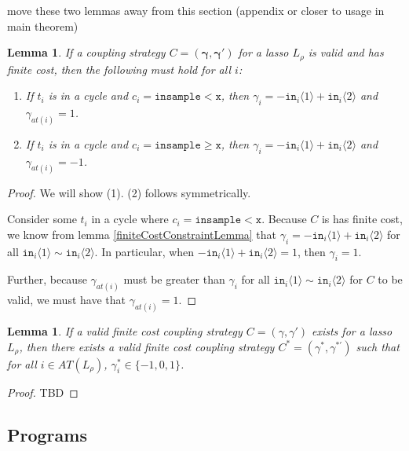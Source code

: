 \documentclass[12pt]{article}
\newcommand{\gguard}[1][x]{\texttt{insample}\geq #1}
\newcommand{\lguard}[1][x]{\texttt{insample} < #1}
\newcommand{\brangle}[1]{\langle #1 \rangle}
\newtheorem{lemma}[thm]{Lemma}
\theoremstyle{definition}
\begin{document}
{\color{red} move these two lemmas away from this section (appendix or closer to usage in main theorem)}

\begin{lemma}\label{cycleGammaConstraints}
    If a coupling strategy $C=(\mathbf{\gamma}, \mathbf{\gamma}')$ for a lasso $L_\rho$ is valid and has finite cost, then the following must hold for all $i$:
    \begin{enumerate}
        \item If $t_i$ is in a cycle and $c_i = \lguard[\texttt{x}]$, then $\gamma_i = -\texttt{in}_i\brangle{1}+\texttt{in}_i\brangle{2}$ and $\gamma_{at(i)} = 1$.
        \item If $t_i$ is in a cycle and $c_i = \gguard[\texttt{x}]$, then $\gamma_i = -\texttt{in}_i\brangle{1}+\texttt{in}_i\brangle{2}$ and $\gamma_{at(i)} = -1$.
    \end{enumerate}
\end{lemma}
\begin{proof}
    We will show (1). (2) follows symmetrically.

    Consider some $t_i$ in a cycle where $c_i = \lguard[\texttt{x}]$. Because $C$ is has finite cost, we know from lemma \ref{finiteCostConstraintLemma} that $\gamma_i = -\texttt{in}_i\brangle{1}+\texttt{in}_i\brangle{2}$ for all  $\texttt{in}_i\brangle{1}\sim\texttt{in}_i\brangle{2}$. In particular, when $-\texttt{in}_i\brangle{1}+\texttt{in}_i\brangle{2}=1$, then $\gamma_i=1$. 
    
    Further, because $\gamma_{at(i)}$ must be greater than $\gamma_i$ for all $\texttt{in}_i\brangle{1}\sim\texttt{in}_i\brangle{2}$ for $C$ to be valid, we must have that $\gamma_{at(i)}=1$.
\end{proof}
\begin{lemma}
    If a valid finite cost coupling strategy $C = (\gamma, \gamma')$ exists for a lasso $L_\rho$, then there exists a valid finite cost coupling strategy $C^*= (\gamma^*, \gamma^{*\prime})$ such that for all $i\in AT(L_\rho)$, $\gamma_i^*\in \{-1, 0, 1\}$. 
\end{lemma}
\begin{proof}
    TBD
\end{proof}

\subsection{Programs}
\end{document}
